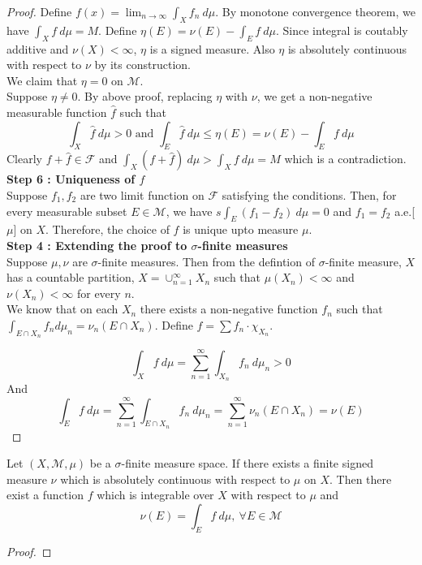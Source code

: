 \begin{proof}
	Define $f(x) = \lim_{n \to \infty} \int_X f_n \ d\mu$.
	By monotone convergence theorem,  we have $\int_X f \ d\mu = M$.
	Define $\eta(E) = \nu(E) - \int_E f \ d\mu$.
	Since integral is coutably additive and $\nu(X) < \infty$, $\eta$ is a signed measure.
	Also $\eta$ is absolutely continuous with respect to $\nu$ by its construction.\\

	We claim that $\eta = 0$ on $\mathcal{M}$.\\
	Suppose $\eta \ne 0$.
	By above proof, replacing $\eta$ with $\nu$, we get a non-negative measurable function $\hat{f}$ such that
	\[ \int_X \hat{f} \ d\mu > 0 \text{ and } \int_E \hat{f} \ d\mu \le \eta(E) = \nu(E) - \int_E f \ d\mu \]
	Clearly $f + \hat{f} \in \mathcal{F}$ and $\displaystyle \int_X (f+\hat{f}) \ d\mu > \int_X f \ d\mu = M$ which is a contradiction.\\

	\textbf{Step 6 : Uniqueness of $f$}\\
	Suppose $f_1,f_2$ are two limit function on $\mathcal{F}$ satisfying the conditions.
	Then, for every measurable subset $E \in \mathcal{M}$, we have $\displaystyle s\int_E (f_1-f_2) \ d\mu = 0$ and $f_1 = f_2$ a.e.[$\mu$] on $X$.
	Therefore, the choice of $f$ is unique upto measure $\mu$.\\

	\textbf{Step 4 : Extending the proof to $\sigma$-finite measures}\\
	Suppose $\mu,\nu$ are $\sigma$-finite measures.
	Then from the defintion of $\sigma$-finite measure, $X$ has a countable partition, $X = \cup_{n =1}^\infty X_n$ such that $\mu(X_n) < \infty$ and $\nu(X_n) < \infty$ for every $n$.\\

	We know that on each $X_n$ there exists a non-negative function $f_n$ such that $\int_{E \cap X_n} f_n d\mu_n = \nu_n(E \cap X_n)$.
	Define $f = \sum f_n \cdot \chi_{X_n}$.

	\[ \int_{X} f \ d\mu = \sum_{n=1}^\infty \int_{X_n} f_n \ d\mu_n > 0 \]
	And
	\[ \int_{E} f \ d\mu = \sum_{n=1}^\infty \int_{E \cap X_n} f_n \ d\mu_n = \sum_{n=1}^\infty \nu_n(E \cap X_n) = \nu(E) \]
\end{proof}

\begin{theorem}
	Let $(X,\mathcal{M},\mu)$ be a $\sigma$-finite measure space.
	If there exists a finite signed measure $\nu$ which is absolutely continuous with respect to $\mu$ on $X$.
	Then there exist a function $f$ which is integrable over $X$ with respect to $\mu$ and
	\begin{equation}
		\nu(E) = \int_E f \ d\mu,\ \forall E \in \mathcal{M} 
	\end{equation}
\end{theorem}
\begin{proof}
\end{proof}

